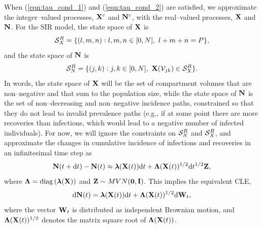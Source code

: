 When (\ref{eqn:tau_cond_1}) and (\ref{eqn:tau_cond_2}) are satisfied, we  approximate the integer--valued processes, $ \mathbf{X}^c $ and $ \mathbf{N}^c $, with the real--valued processes, $ \mathbf{X} $ and $ \mathbf{N} $. For the SIR model, the state space of $ \mathbf{X} $ is $$ \mcS_X^R = \lbrace (l,m,n):l,m,n \in [0,N],\ l+m+n=P\rbrace, $$ and the state space  of $ \mathbf{N} $ is $$ \mcS_N^R = \lbrace (j,k): j,k \in [0,N],\ \bX(\mcV_{jk})\in\mcS_X^R \rbrace. $$ In words, the state space of $ \mathbf{X} $ will be the set of compartment volumes that are non--negative and that sum to the population size, while the state space of $ \mathbf{N} $ is the set of non--decreasing and non--negative incidence paths, constrained so that they do not lead to invalid prevalence paths (e.g., if at some point there are more recoveries than infections, which would lead to a negative number of infected individuals). For now, we will ignore the constraints on $ \mathcal{S}_N^R $ and $ \mathcal{S}_X^R $, and approximate the changes in cumulative incidence of infections and recoveries in an infinitesimal time step as 
\begin{equation}
\mathbf{N}(t+\mathrm{d} t) - \mathbf{N}(t) \approx \boldsymbol{\lambda}(\mathbf{X}(t))\mathrm{d} t + \boldsymbol{\Lambda}(\mathbf{X}(t))^{1/2}\mathrm{d} t^{1/2}\mathbf{Z},
\end{equation}
where $ \boldsymbol{\Lambda} = \mathrm{diag}\left (\boldsymbol{\lambda}(\mathbf{X}) \right )$ and $ \mathbf{Z}\sim MVN(\boldsymbol{0},\mathbf{I}) $. This implies the equivalent CLE,
\begin{equation}
\label{eqn:sir_cle_X}
\mathrm{d} \mathbf{N}(t) = \boldsymbol{\lambda}(\mathbf{X}(t))\mathrm{d} t + \boldsymbol{\Lambda}(\mathbf{X}(t))^{1/2}\mathrm{d}\mathbf{W}_t, 
\end{equation}
where the vector $ \mathbf{W}_t $ is distributed as independent Brownian motion, and $ \boldsymbol{\Lambda}(\mathbf{X}(t))^{1/2} $ denotes the matrix square root of $ \boldsymbol{\Lambda}(\mathbf{X}(t)) $. 

